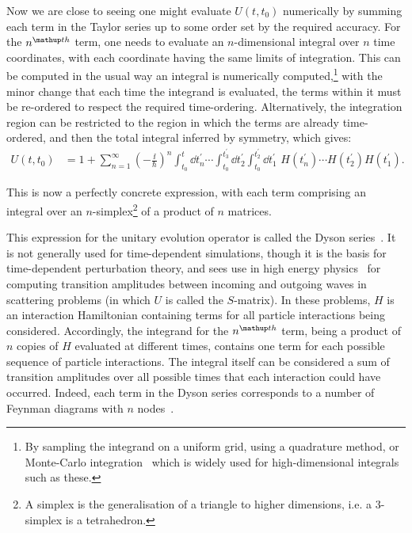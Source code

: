 Now we are close to seeing one might evaluate $U(t, t_0)$ numerically by summing each term in the Taylor series up to some order set by the required accuracy. For the $n^{\up{th}}$ term, one needs to evaluate an $n$-dimensional integral over $n$ time coordinates, with each coordinate having the same limits of integration. This can be computed in the usual way an integral is numerically computed,\footnote{By sampling the integrand on a uniform grid, using a quadrature method, or Monte-Carlo integration~\cite{weinzierl_introduction_2000} which is widely used for high-dimensional integrals such as these.} with the minor change that each time the integrand is evaluated, the terms within it must be re-ordered to respect the required time-ordering. Alternatively, the integration region can be restricted to the region in which the terms are already time-ordered, and then the total integral inferred by symmetry, which gives:
\begin{align}\label{eq:dyson_series}
U(t, t_0)
&= 1 + \sum_{n=1}^\infty \left(-\frac \ii \hbar \right)^n
\int_{t_0}^t \dd t_n^\prime
\cdots
\int_{t_0}^{t^\prime_3} \dd t_2^\prime
\int_{t_0}^{t^\prime_2} \dd t_1^\prime
\,\,
H(t_n^\prime)\cdots H(t_2^\prime)H(t_1^\prime).
\end{align}

This is now a perfectly concrete expression, with each term comprising an integral over an $n$-simplex\footnote{A simplex is the generalisation of a triangle to higher dimensions, i.e. a 3-simplex is a tetrahedron.} of a product of $n$ matrices.

This expression for the unitary evolution operator is called the Dyson series~\cite{dyson_s_1949}. It is not generally used for time-dependent simulations, though it is the basis for time-dependent perturbation theory, and sees use in high energy physics~\cite{kaplunovsky_perturbation_2016,dyson_s_1949} for computing transition amplitudes between incoming and outgoing waves in scattering problems (in which $U$ is called the $S$-matrix). In these problems, $H$ is an interaction Hamiltonian containing terms for all particle interactions being considered. Accordingly, the integrand for the $n^\up{th}$ term, being a product of $n$ copies of $H$ evaluated at different times, contains one term for each possible sequence of particle interactions.
The integral itself can be considered a sum of transition amplitudes over all possible times that each interaction could have occurred. Indeed, each term in the Dyson series corresponds to a number of Feynman diagrams with $n$ nodes~\cite{kaplunovsky_perturbation_2016}.

